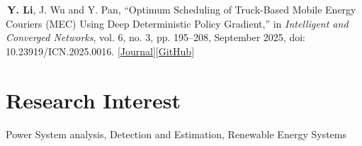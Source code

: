 \documentclass[11pt, letterpaper]{article}
\begin{document}
\textbullet\,\textbf{Y. Li}, J. Wu and Y. Pan, ``Optimum Scheduling of Truck-Based Mobile Energy Couriers (MEC) Using Deep Deterministic Policy Gradient,'' in \textit{Intelligent and Converged Networks}, vol. 6, no. 3, pp. 195--208, September 2025, doi: 10.23919/ICN.2025.0016. [\href{https://ieeexplore.ieee.org/document/11045963}{Journal}][\href{https://github.com/Arthurliyaze}{GitHub}]

\section{Research Interest}

Power System analysis, Detection and Estimation, Renewable Energy Systems
\end{document}
